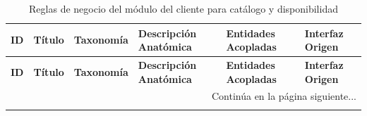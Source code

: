 \begin{landscape}
\begin{longtable}[c]{l p{2.1cm} p{2.1cm} p{8cm} p{4cm} p{3cm}}
\caption{Reglas de negocio del módulo del cliente para catálogo y disponibilidad} \label{tab:reglas-negocio-cliente-catalogo-disponibilidad}\\
\toprule
\textbf{ID} & \textbf{Título} & \textbf{Taxonomía} & \textbf{Descripción Anatómica} & \textbf{Entidades Acopladas} & \textbf{Interfaz Origen} \\
\midrule
\endfirsthead

\toprule
\textbf{ID} & \textbf{Título} & \textbf{Taxonomía} & \textbf{Descripción Anatómica} & \textbf{Entidades Acopladas} & \textbf{Interfaz Origen} \\
\midrule
\endhead

\midrule
\multicolumn{6}{r}{\small Continúa en la página siguiente...} \\
\endfoot
\bottomrule
\endlastfoot


\end{longtable}
\end{landscape}
